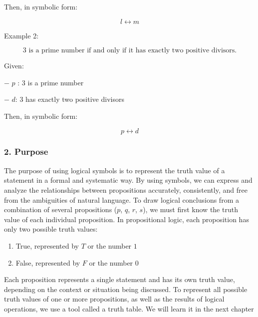 \begin{enumerate}
\begin{enumerate}
    Then, in symbolic form:

    \[
     l \leftrightarrow m
     \]

    Example 2:

    \[\text {3 is a prime number if and only if it has exactly two positive divisors.}\]

    Given:

    − \(p\) : 3 is a prime number

    − \(d\): 3 has exactly two positive divisors

    Then, in symbolic form:

    \[ p\leftrightarrow d\]
  \end{enumerate}
\end{enumerate}

\subsubsection{2. Purpose}\label{purpose}

The purpose of using logical symbols is to represent the truth value of
a statement in a formal and systematic way. By using symbols, we can
express and analyze the relationships between propositions accurately,
consistently, and free from the ambiguities of natural language. To draw
logical conclusions from a combination of several propositions (\(p\),
\(q\), \(r\), \(s\)), we must first know the truth value of each
individual proposition. In propositional logic, each proposition has
only two possible truth values:

\begin{enumerate}
\def\labelenumi{\arabic{enumi}.}
\item
  True, represented by \(T\) or the number \(1\)
\item
  False, represented by \(F\) or the number \(0\)
\end{enumerate}

Each proposition represents a single statement and has its own truth
value, depending on the context or situation being discussed. To
represent all possible truth values of one or more propositions, as well
as the results of logical operations, we use a tool called a truth
table. We will learn it in the next chapter
